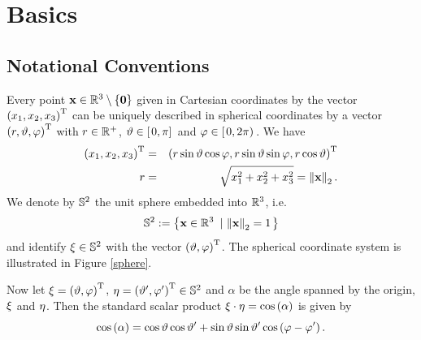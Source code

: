 \chapter{Basics}
\label{Basics}

\section{Notational Conventions}
\label{Basics:Notation}

Every point $\mathbf{x} \in \mathbb{R}^3 \setminus \left\{\mathbf{0}\right\rbrace$ given in Cartesian coordinates by the vector 
$\left(x_1,x_2,x_3\right)^{\text{\rm{T}}}$ can be uniquely described in spherical coordinates by a vector
$\left(r,\vartheta,\varphi\right)^{\text{\rm{T}}}$ with $r \in \mathbb{R}^{+}$, $\vartheta \in \left[\left.0,\pi\right]\right.$ and 
$\varphi \in \left[\left.0,2\pi\right)\right.$.
We have
\begin{eqnarray*}
  \left(x_1,x_2,x_3\right)^{\text{\rm{T}}} & = & \left(r \sin \vartheta \cos \varphi, r \sin \vartheta \sin \varphi, r \cos \vartheta\right)^{\text{\rm{T}}}\\
  r & = & \sqrt{x_1^2+x_2^2+x_3^2} = \left\|\mathbf{x}\right\|_2.
\end{eqnarray*} 
We denote by $\mathbb{S}^2$ the unit sphere embedded into $\mathbb{R}^3$, i.e. 
$$\mathbb{S}^2 := \left\{\mathbf{x} \in \mathbb{R}^{3}\ \left|\ \left\|\mathbf{x}\right\|_2=1\right.\right\rbrace$$ 
and identify $\mathbf{\xi} \in \mathbb{S}^2$ with the vector $\left(\vartheta,\varphi\right)^{\text{\rm{T}}}$. The 
spherical coordinate system is illustrated in Figure \ref{sphere}.

Now let $\mathbf{\xi} = \left(\vartheta,\varphi\right)^{\text{\rm{T}}}$, $\mathbf{\eta} = \left(\vartheta',\varphi'\right)^{\text{\rm{T}}} \in
\mathbb{S}^2$ and $\alpha$ be the angle spanned by the origin, $\mathbf{\xi}$ and $\mathbf{\eta}$.
Then the standard scalar product
$\mathbf{\xi} \cdot \mathbf{\eta} = \cos\left(\alpha\right)$ is given by
\begin{equation}
  \nonumber
  \cos{\hspace{-0.4ex}}\left(\alpha\right) = \cos\vartheta\cos\vartheta' +
  \sin\vartheta\sin\vartheta'\cos{\hspace{-0.4ex}}\left(\varphi-\varphi'\right).
\end{equation}

